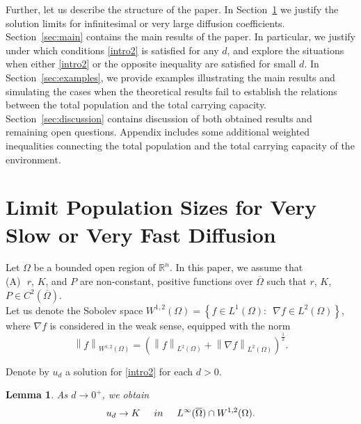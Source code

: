 \documentclass[11pt]{article}
\newcommand{\R}{\mathbb{R}}
\newcommand{\norm}[1]{\left\|#1\right\|}
\newcommand{\parentheses}[1]{\left(#1\right)}
\newcommand{\braces}[1]{\left\{#1\right\}}
\newtheorem{lemma}[statement]{Lemma}
\theoremstyle{definition}
\theoremstyle{remark}
\begin{document}
Further, let us describe the structure of the paper. In Section~\ref{sec:auxil} we justify the solution limits for infinitesimal or very large diffusion coefficients.
Section~\ref{sec:main} contains the main results of the paper.
In particular, we justify under which conditions \eqref{intro2} is satisfied for any $d$, and explore the situations when either  \eqref{intro2}  or the opposite inequality are satisfied for small $d$. In Section~\ref{sec:examples}, we provide examples illustrating the main results and simulating the cases when the theoretical results fail to establish the relations between the total population and the total carrying capacity. 
Section~\ref{sec:discussion} contains discussion of both obtained results and remaining open questions. Appendix includes some additional weighted inequalities connecting the total population and the total carrying capacity of the environment. 





\section{Limit Population Sizes for Very Slow or Very Fast Diffusion}
\label{sec:auxil}


Let $\Omega$ be a bounded open region of $\R^n$. In this paper, we assume that\\

\noindent (A) \,\,$r$, $K$, and $P$ are non-constant, positive functions over $\overline{\Omega}$ such that $r$, $K$, $P\in C^2(\overline{\Omega})$.\\ 

Let us denote the Sobolev space $W^{1,2}(\Omega)=\braces{f\in L^1(\Omega):\,\,\,\nabla f\in L^2(\Omega)}$, where  $\nabla f$ is considered in the weak sense, equipped with the norm
\begin{equation*}
    \norm{f}_{W^{1,2}(\Omega)}=\parentheses{\norm{f}_{L^2(\Omega)}+\norm{\nabla f}_{L^2(\Omega)}}^\frac{1}{2}.
\end{equation*}

Denote by $u_d$ a solution for \eqref{intro2} for each $d>0$. 


\begin{lemma}\label{Prop_1_DeAngelis}
    As $d\to0^+$, we obtain
    \begin{equation*}
         u_d\to K\hspace{0.5cm} in \hspace{0.5cm} L^\infty(\overline{\Omega})\cap W^{1,2}(\Omega).
    \end{equation*}
\end{lemma}
\end{document}
